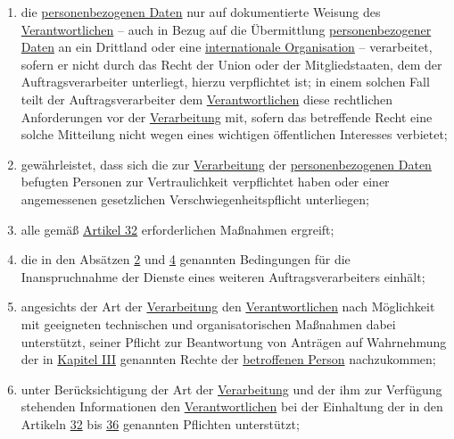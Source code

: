 \begin{enumerate}
\begin{enumerate}
    \item die \hyperref[itm:04-1]{personenbezogenen Daten} nur auf dokumentierte Weisung des \hyperref[itm:04-7]{Verantwortlichen} -- auch in Bezug auf die
     Übermittlung \hyperref[itm:04-1]{personenbezogener Daten} an ein Drittland oder eine \hyperref[itm:04-29]{internationale Organisation} -- verarbeitet, sofern
     er nicht durch das Recht der Union oder der Mitgliedstaaten, dem der Auftragsverarbeiter unterliegt, hierzu
     verpflichtet ist; in einem solchen Fall teilt der Auftragsverarbeiter dem \hyperref[itm:04-7]{Verantwortlichen} diese rechtlichen
     Anforderungen vor der \hyperref[itm:04-2]{Verarbeitung} mit, sofern das betreffende Recht eine solche Mitteilung nicht wegen eines
     wichtigen öffentlichen Interesses verbietet;
    \label{itm:28-3-1a}

    \item gewährleistet, dass sich die zur \hyperref[itm:04-2]{Verarbeitung} der \hyperref[itm:04-1]{personenbezogenen Daten} befugten Personen zur
     Vertraulichkeit verpflichtet haben oder einer angemessenen gesetzlichen Verschwiegenheitspflicht unterliegen;
    \label{itm:28-3-1b}

    \item alle gemäß \hyperref[ch:32]{Artikel 32} erforderlichen Maßnahmen ergreift;
    \label{itm:28-3-1c}

    \item die in den Absätzen \hyperref[itm:28-2]{2} und \hyperref[itm:28-4]{4} genannten Bedingungen für die
     Inanspruchnahme der Dienste eines weiteren Auftragsverarbeiters einhält;
    \label{itm:28-3-1d}

    \item angesichts der Art der \hyperref[itm:04-2]{Verarbeitung} den \hyperref[itm:04-7]{Verantwortlichen} nach Möglichkeit mit geeigneten technischen und
     organisatorischen Maßnahmen dabei unterstützt, seiner Pflicht zur Beantwortung von Anträgen auf Wahrnehmung der in
     \hyperref[part:3]{Kapitel III} genannten Rechte der \hyperref[itm:04-1]{betroffenen Person} nachzukommen;
    \label{itm:28-3-1e}

    \item unter Berücksichtigung der Art der \hyperref[itm:04-2]{Verarbeitung} und der ihm zur Verfügung stehenden Informationen den
     \hyperref[itm:04-7]{Verantwortlichen} bei der Einhaltung der in den Artikeln \hyperref[ch:32]{32} bis \hyperref[ch:36]{36} genannten
     Pflichten unterstützt;
    \label{itm:28-3-1f}


\end{enumerate}
\end{enumerate}
